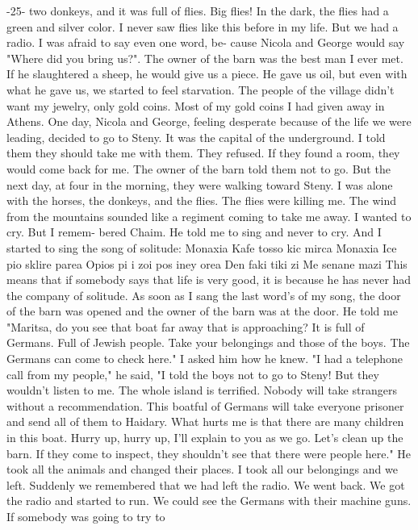 -25- 
two donkeys, and it was full of flies.
Big flies!
In the dark, the 
flies had a green and silver color.
I never saw flies like this before 
in my life.
But we had a radio.
I was afraid to say even one word, be-
cause Nicola and George would say "Where did you bring us?".
The owner 
of the barn was the best man I ever met.
If he slaughtered a sheep, he 
 would give us a piece.
He gave us oil, but even with what he gave us, 
we started to feel starvation.
The people of the village didn’t want 
my jewelry, only gold coins.
Most of my gold coins I had given away 
in Athens.
One day, Nicola and George, feeling desperate because of the life 
we were leading, decided to go to Steny.
It was the capital of the 
underground.
I told them they should take me with them.
They refused.
If they found a room, they would come back for me.
The owner of the barn 
told them not to go.
But the next day, at four in the morning, they were 
walking toward Steny.
I was alone with the horses, the donkeys, and the 
flies.
The flies were killing me.
The wind from the mountains sounded 
like a regiment coming to take me away.
I wanted to cry.
But I remem-
bered Chaim.
He told me to sing and never to cry.
And I started to 
sing the song of solitude: 
Monaxia 
Kafe tosso kic mirca 
Monaxia 
Ice pio sklire parea 
Opios pi i zoi pos iney orea 
Den faki tiki zi 
Me senane mazi 
This means that if somebody says that life is very good, it 
is because he has never had the company of solitude.
As soon as I sang 
the last word's of my song, the door of the barn was opened and the 
owner of the barn was at the door.
He told me "Maritsa, do you see that boat far away that is 
approaching?
It is full of Germans.
Full of Jewish people.
Take your 
belongings and those of the boys.
The Germans can come to check here."
I asked him how he knew.
"I had a telephone call from my people," he 
said, "I told the boys not to go to Steny!
But they wouldn't listen 
to me.
The whole island is terrified.
Nobody will take strangers without a recommendation.
This boatful of Germans will take everyone prisoner and send all of them to Haidary.
What hurts me is that there are many children in this boat.
Hurry up, hurry up, I'll explain to 
you as we go.
Let's clean up the barn.
If they come to inspect, they 
shouldn’t see that there were people here."
He took all the animals and changed their places.
I took all our 
belongings and we left.
Suddenly we remembered that we had left the 
radio.
We went back.
We got the radio and started to run.
We could see 
the Germans with their machine guns.
If somebody was going to try to 
